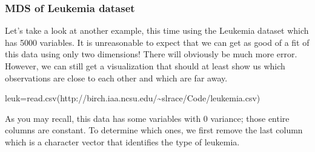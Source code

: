\documentclass[
]{article}
\newenvironment{Shaded}{\begin{snugshade}}{\end{snugshade}}
\newcommand{\AttributeTok}[1]{\textcolor[rgb]{0.77,0.63,0.00}{#1}}
\newcommand{\CommentTok}[1]{\textcolor[rgb]{0.56,0.35,0.01}{\textit{#1}}}
\newcommand{\ConstantTok}[1]{\textcolor[rgb]{0.00,0.00,0.00}{#1}}
\newcommand{\DecValTok}[1]{\textcolor[rgb]{0.00,0.00,0.81}{#1}}
\newcommand{\FunctionTok}[1]{\textcolor[rgb]{0.00,0.00,0.00}{#1}}
\newcommand{\NormalTok}[1]{#1}
\newcommand{\OtherTok}[1]{\textcolor[rgb]{0.56,0.35,0.01}{#1}}
\newcommand{\SpecialCharTok}[1]{\textcolor[rgb]{0.00,0.00,0.00}{#1}}
\newcommand{\StringTok}[1]{\textcolor[rgb]{0.31,0.60,0.02}{#1}}
\theoremstyle{definition}
\theoremstyle{definition}
\theoremstyle{definition}
\theoremstyle{definition}
\theoremstyle{remark}
\begin{document}
\hypertarget{mds-of-leukemia-dataset}{%
\subsubsection{MDS of Leukemia dataset}\label{mds-of-leukemia-dataset}}

Let's take a look at another example, this time using the Leukemia dataset which has 5000 variables. It is unreasonable to expect that we can get as good of a fit of this data using only two dimensions! There will obviously be much more error. However, we can still get a visualization that should at least show us which observations are close to each other and which are far away.

\begin{Shaded}
\begin{Highlighting}[]
\NormalTok{leuk}\OtherTok{=}\FunctionTok{read.csv}\NormalTok{(}\StringTok{\textquotesingle{}http://birch.iaa.ncsu.edu/\textasciitilde{}slrace/Code/leukemia.csv\textquotesingle{}}\NormalTok{)}
\end{Highlighting}
\end{Shaded}

As you may recall, this data has some variables with 0 variance; those entire columns are constant. To determine which ones, we first remove the last column which is a character vector that identifies the type of leukemia.

\begin{Shaded}
\end{Shaded}
\end{document}
